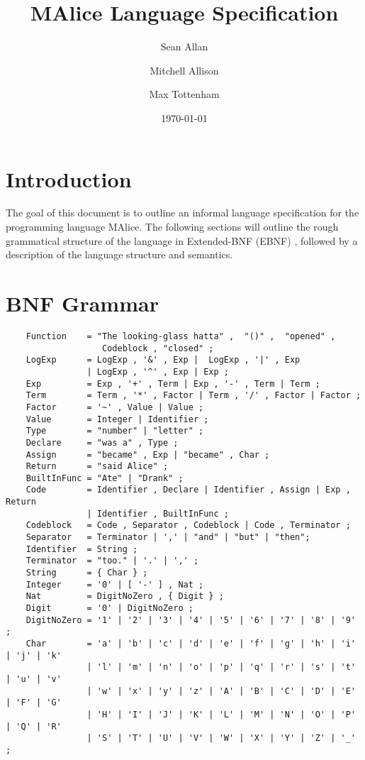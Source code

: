 \documentclass[a4wide, 10pt]{article}
\begin{document}
\title{MAlice Language Specification}

\author{Sean Allan \and Mitchell Allison \and Max Tottenham}

\date{\today}         %

\maketitle            %

\section{Introduction}
The goal of this document is to outline an informal language specification for 
the programming language MAlice. The following sections will outline the rough
grammatical structure of the language in Extended-BNF (EBNF) \cite{Wikipedia},
followed by a description of the language structure and semantics.

\section{BNF Grammar} 
\begin{verbatim}
    Function    = "The looking-glass hatta" ,  "()" ,  "opened" , 
                   Codeblock , "closed" ;
    LogExp      = LogExp , '&' , Exp |  LogExp , '|' , Exp 
                | LogExp , '^' , Exp | Exp ;
    Exp         = Exp , '+' , Term | Exp , '-' , Term | Term ;
    Term        = Term , '*' , Factor | Term , '/' , Factor | Factor ;
    Factor      = '~' , Value | Value ;
    Value       = Integer | Identifier ;
    Type        = "number" | "letter" ;
    Declare     = "was a" , Type ;
    Assign      = "became" , Exp | "became" , Char ;
    Return      = "said Alice" ;
    BuiltInFunc = "Ate" | "Drank" ;
    Code        = Identifier , Declare | Identifier , Assign | Exp , Return  
                | Identifier , BuiltInFunc ;
    Codeblock   = Code , Separator , Codeblock | Code , Terminator ; 
    Separator   = Terminator | ',' | "and" | "but" | "then"; 
    Identifier  = String ;
    Terminator  = "too." | '.' | ',' ;
    String      = { Char } ;
    Integer     = '0' | [ '-' ] , Nat ;
    Nat         = DigitNoZero , { Digit } ;
    Digit       = '0' | DigitNoZero ; 
    DigitNoZero = '1' | '2' | '3' | '4' | '5' | '6' | '7' | '8' | '9' ;
    Char        = 'a' | 'b' | 'c' | 'd' | 'e' | 'f' | 'g' | 'h' | 'i' | 'j' | 'k' 
                | 'l' | 'm' | 'n' | 'o' | 'p' | 'q' | 'r' | 's' | 't' | 'u' | 'v'
                | 'w' | 'x' | 'y' | 'z' | 'A' | 'B' | 'C' | 'D' | 'E' | 'F' | 'G'
                | 'H' | 'I' | 'J' | 'K' | 'L' | 'M' | 'N' | 'O' | 'P' | 'Q' | 'R'
                | 'S' | 'T' | 'U' | 'V' | 'W' | 'X' | 'Y' | 'Z' | '_' ;
\end{verbatim}
\end{document}
